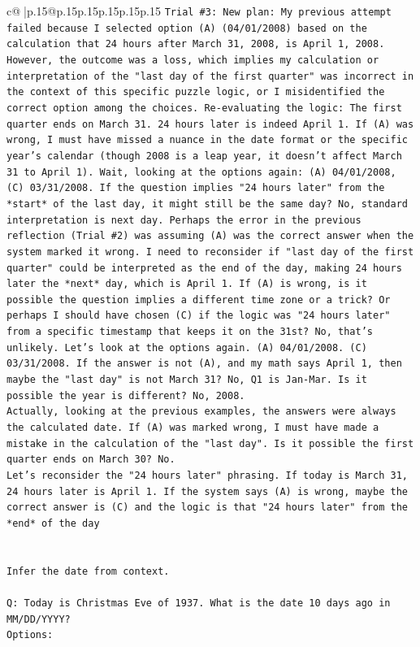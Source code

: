 \documentclass{article}
\begin{document}
{\begin{supertabular}{c@{$\;$}|p{.15\linewidth}@{}p{.15\linewidth}p{.15\linewidth}p{.15\linewidth}p{.15\linewidth}p{.15\linewidth}}
{{{\texttt{Trial \#3: New plan: My previous attempt failed because I selected option (A) (04/01/2008) based on the calculation that 24 hours after March 31, 2008, is April 1, 2008. However, the outcome was a loss, which implies my calculation or interpretation of the "last day of the first quarter" was incorrect in the context of this specific puzzle logic, or I misidentified the correct option among the choices. Re{-}evaluating the logic: The first quarter ends on March 31. 24 hours later is indeed April 1. If (A) was wrong, I must have missed a nuance in the date format or the specific year's calendar (though 2008 is a leap year, it doesn't affect March 31 to April 1). Wait, looking at the options again: (A) 04/01/2008, (C) 03/31/2008. If the question implies "24 hours later" from the *start* of the last day, it might still be the same day? No, standard interpretation is next day. Perhaps the error in the previous reflection (Trial \#2) was assuming (A) was the correct answer when the system marked it wrong. I need to reconsider if "last day of the first quarter" could be interpreted as the end of the day, making 24 hours later the *next* day, which is April 1. If (A) is wrong, is it possible the question implies a different time zone or a trick? Or perhaps I should have chosen (C) if the logic was "24 hours later" from a specific timestamp that keeps it on the 31st? No, that's unlikely. Let's look at the options again. (A) 04/01/2008. (C) 03/31/2008. If the answer is not (A), and my math says April 1, then maybe the "last day" is not March 31? No, Q1 is Jan{-}Mar. Is it possible the year is different? No, 2008.} \\
\texttt{Actually, looking at the previous examples, the answers were always the calculated date. If (A) was marked wrong, I must have made a mistake in the calculation of the "last day". Is it possible the first quarter ends on March 30? No.} \\
\texttt{Let's reconsider the "24 hours later" phrasing. If today is March 31, 24 hours later is April 1. If the system says (A) is wrong, maybe the correct answer is (C) and the logic is that "24 hours later" from the *end* of the day} \\
\\ 
\\ 
\texttt{Infer the date from context.} \\
\\ 
\texttt{Q: Today is Christmas Eve of 1937. What is the date 10 days ago in MM/DD/YYYY?} \\
\texttt{Options:} \\
}}}
\end{supertabular}}
\end{document}
